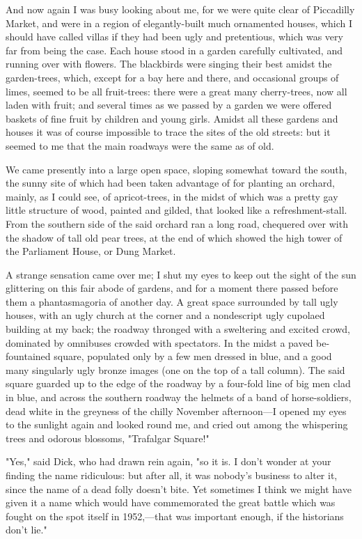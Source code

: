 And now again I was busy looking about me, for we were quite clear of
Piccadilly Market, and were in a region of elegantly-built much
ornamented houses, which I should have called villas if they had been
ugly and pretentious, which was very far from being the case. Each house
stood in a garden carefully cultivated, and running over with flowers.
The blackbirds were singing their best amidst the garden-trees, which,
except for a bay here and there, and occasional groups of limes, seemed
to be all fruit-trees: there were a great many cherry-trees, now all
laden with fruit; and several times as we passed by a garden we were
offered baskets of fine fruit by children and young girls. Amidst all
these gardens and houses it was of course impossible to trace the sites
of the old streets: but it seemed to me that the main roadways were the
same as of old.

We came presently into a large open space, sloping somewhat toward the
south, the sunny site of which had been taken advantage of for planting
an orchard, mainly, as I could see, of apricot-trees, in the midst of
which was a pretty gay little structure of wood, painted and gilded,
that looked like a refreshment-stall. From the southern side of the said
orchard ran a long road, chequered over with the shadow of tall old pear
trees, at the end of which showed the high tower of the Parliament
House, or Dung Market.

A strange sensation came over me; I shut my eyes to keep out the sight
of the sun glittering on this fair abode of gardens, and for a moment
there passed before them a phantasmagoria of another day. A great space
surrounded by tall ugly houses, with an ugly church at the corner and a
nondescript ugly cupolaed building at my back; the roadway thronged with
a sweltering and excited crowd, dominated by omnibuses crowded with
spectators. In the midst a paved be-fountained square, populated only by
a few men dressed in blue, and a good many singularly ugly bronze images
(one on the top of a tall column). The said square guarded up to the
edge of the roadway by a four-fold line of big men clad in blue, and
across the southern roadway the helmets of a band of horse-soldiers,
dead white in the greyness of the chilly November afternoon---I opened
my eyes to the sunlight again and looked round me, and cried out among
the whispering trees and odorous blossoms, "Trafalgar Square!"

"Yes," said Dick, who had drawn rein again, "so it is. I don't wonder at
your finding the name ridiculous: but after all, it was nobody's
business to alter it, since the name of a dead folly doesn't bite. Yet
sometimes I think we might have given it a name which would have
commemorated the great battle which was fought on the spot itself in
1952,---that was important enough, if the historians don't lie."

